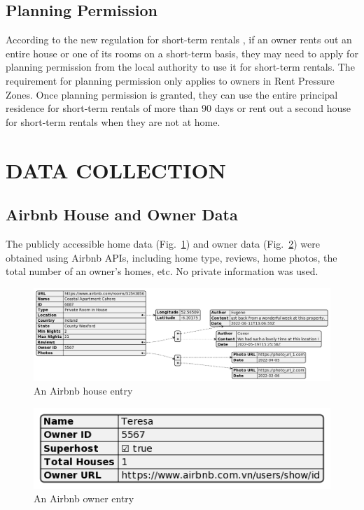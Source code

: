 \documentclass[conference, compsoc]{IEEEtran}
\begin{document}
\subsection{Planning Permission}
According to the new regulation for short-term rentals \cite{planning-development-regulations}, if an owner rents out an entire house or one of its rooms on a short-term basis, they may need to apply for planning permission \cite{citizen-planning-permission} from the local authority to use it for short-term rentals.
The requirement for planning permission only applies to owners in Rent Pressure Zones.
Once planning permission is granted, they can use the entire principal residence for short-term rentals of more than $90$ days or rent out a second house for short-term rentals when they are not at home.


\section{DATA COLLECTION}
\subsection{Airbnb House and Owner Data}
The publicly accessible home data (Fig.~\ref{fig:airbnb-house-entry}) and owner data (Fig.~\ref{fig:airbnb-owner-entry}) were obtained using Airbnb APIs, including home type, reviews, home photos, the total number of an owner's homes, etc.
No private information was used.

\begin{figure}[htbp]
    \centerline{\includegraphics[width=\linewidth]{figures/airbnb-house-entry.png}}
    \caption{An Airbnb house entry}
    \label{fig:airbnb-house-entry}
\end{figure}

\begin{figure}[htbp]
    \centerline{\includegraphics[width=0.6\linewidth]{figures/airbnb-owner-entry.png}}
    \caption{An Airbnb owner entry}
    \label{fig:airbnb-owner-entry}
\end{figure}
\end{document}
